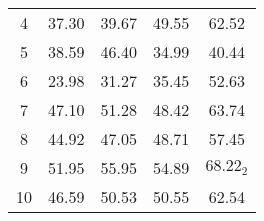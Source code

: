 \begin{table}[htp!]
\begin{tabular}{c|cccc}
4                           & \cellcolor[HTML]{C0C0C0}37.30          & \cellcolor[HTML]{C0C0C0}39.67           & \cellcolor[HTML]{C0C0C0}49.55           & \cellcolor[HTML]{C0C0C0}62.52                                \\ \cline{2-5}
5                           & 38.59                                  & 46.40                                   & 34.99                                   & 40.44                                                        \\ \cline{2-5}
6                           & 23.98                                  & 31.27                                   & 35.45                                   & 52.63                                                        \\ \cline{2-5}
7                           & 47.10                                  & 51.28                                   & 48.42                                   & 63.74                                                        \\ \cline{2-5}
8                           & \cellcolor[HTML]{C0C0C0}44.92          & \cellcolor[HTML]{C0C0C0}47.05           & \cellcolor[HTML]{C0C0C0}48.71           & \cellcolor[HTML]{C0C0C0}57.45                                \\ \cline{2-5}
9                           & \cellcolor[HTML]{C0C0C0}51.95          & \cellcolor[HTML]{C0C0C0}55.95           & \cellcolor[HTML]{C0C0C0}54.89           & \cellcolor[HTML]{C0C0C0}$68.22_2$                            \\ \cline{2-5}
10                          & \cellcolor[HTML]{C0C0C0}46.59          & \cellcolor[HTML]{C0C0C0}50.53           & \cellcolor[HTML]{C0C0C0}50.55           & \cellcolor[HTML]{C0C0C0}62.54                                \\ \hline
\end{tabular}
\end{table}
